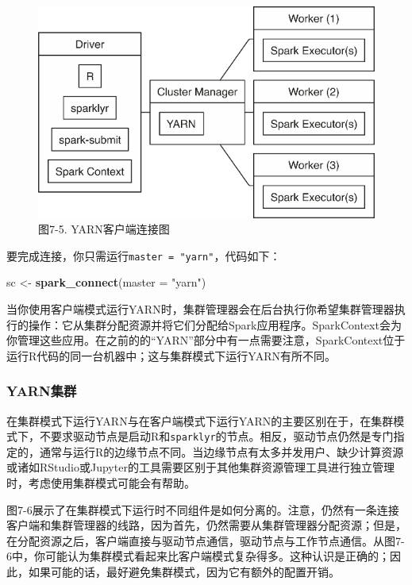 \documentclass[
]{article}
\newenvironment{Shaded}{\begin{snugshade}}{\end{snugshade}}
\newcommand{\DataTypeTok}[1]{\textcolor[rgb]{0.13,0.29,0.53}{#1}}
\newcommand{\KeywordTok}[1]{\textcolor[rgb]{0.13,0.29,0.53}{\textbf{#1}}}
\newcommand{\NormalTok}[1]{#1}
\newcommand{\StringTok}[1]{\textcolor[rgb]{0.31,0.60,0.02}{#1}}
\begin{document}
\begin{figure}
\centering
\includegraphics{figures/7_5.png}
\caption{图7-5. YARN客户端连接图}
\end{figure}

要完成连接，你只需运行\texttt{master\ =\ "yarn"}，代码如下：

\begin{Shaded}
\begin{Highlighting}[]
\NormalTok{sc <-}\StringTok{ }\KeywordTok{spark_connect}\NormalTok{(}\DataTypeTok{master =} \StringTok{"yarn"}\NormalTok{)}
\end{Highlighting}
\end{Shaded}

当你使用客户端模式运行YARN时，集群管理器会在后台执行你希望集群管理器执行的操作：它从集群分配资源并将它们分配给Spark应用程序。SparkContext会为你管理这些应用。在之前的的``YARN''部分中有一点需要注意，SparkContext位于运行R代码的同一台机器中；这与集群模式下运行YARN有所不同。

\hypertarget{yarnux96c6ux7fa4}{%
\subsubsection{YARN集群}\label{yarnux96c6ux7fa4}}

在集群模式下运行YARN与在客户端模式下运行YARN的主要区别在于，在集群模式下，不要求驱动节点是启动R和\texttt{sparklyr}的节点。相反，驱动节点仍然是专门指定的，通常与运行R的边缘节点不同。当边缘节点有太多并发用户、缺少计算资源或诸如RStudio或Jupyter的工具需要区别于其他集群资源管理工具进行独立管理时，考虑使用集群模式可能会有帮助。

图7-6展示了在集群模式下运行时不同组件是如何分离的。注意，仍然有一条连接客户端和集群管理器的线路，因为首先，仍然需要从集群管理器分配资源；但是，在分配资源之后，客户端直接与驱动节点通信，驱动节点与工作节点通信。从图7-6中，你可能认为集群模式看起来比客户端模式复杂得多。这种认识是正确的；因此，如果可能的话，最好避免集群模式，因为它有额外的配置开销。
\end{document}
